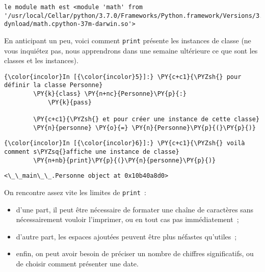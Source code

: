     \begin{Verbatim}[commandchars=\\\{\},frame=single,framerule=0.3mm,rulecolor=\color{cellframecolor}]
le module math est <module 'math' from '/usr/local/Cellar/python/3.7.0/Frameworks/Python.framework/Versions/3.7/lib/python3.7/lib-dynload/math.cpython-37m-darwin.so'>
\end{Verbatim}

    En anticipant un peu, voici comment \texttt{print} présente les
instances de classe (ne vous inquiétez pas, nous apprendrons dans une
semaine ultérieure ce que sont les classes et les instances).

    \begin{Verbatim}[commandchars=\\\{\},frame=single,framerule=0.3mm,rulecolor=\color{cellframecolor}]
{\color{incolor}In [{\color{incolor}5}]:} \PY{c+c1}{\PYZsh{} pour définir la classe Personne}
        \PY{k}{class} \PY{n+nc}{Personne}\PY{p}{:}
            \PY{k}{pass}
        
        \PY{c+c1}{\PYZsh{} et pour créer une instance de cette classe}
        \PY{n}{personne} \PY{o}{=} \PY{n}{Personne}\PY{p}{(}\PY{p}{)}
\end{Verbatim}


    \begin{Verbatim}[commandchars=\\\{\},frame=single,framerule=0.3mm,rulecolor=\color{cellframecolor}]
{\color{incolor}In [{\color{incolor}6}]:} \PY{c+c1}{\PYZsh{} voilà comment s\PYZsq{}affiche une instance de classe}
        \PY{n+nb}{print}\PY{p}{(}\PY{n}{personne}\PY{p}{)}
\end{Verbatim}


    \begin{Verbatim}[commandchars=\\\{\},frame=single,framerule=0.3mm,rulecolor=\color{cellframecolor}]
<\_\_main\_\_.Personne object at 0x10b40a8d0>
\end{Verbatim}

    On rencontre assez vite les limites de \texttt{print}~:

\begin{itemize}
\tightlist
\item
  d'une part, il peut être nécessaire de formater une chaîne de
  caractères sans nécessairement vouloir l'imprimer, ou en tout cas pas
  immédiatement~;
\item
  d'autre part, les espaces ajoutées peuvent être plus néfastes
  qu'utiles~;
\item
  enfin, on peut avoir besoin de préciser un nombre de chiffres
  significatifs, ou de choisir comment présenter une date.
\end{itemize}

